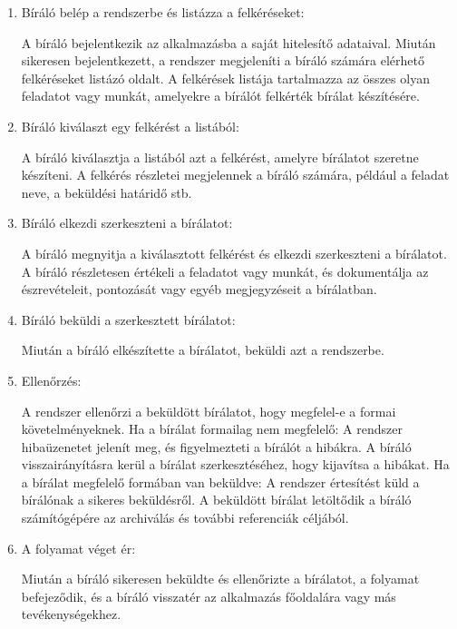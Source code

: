 \begin{enumerate}

\item Bíráló belép a rendszerbe és listázza a felkéréseket:

A bíráló bejelentkezik az alkalmazásba a saját hitelesítő adataival.
Miután sikeresen bejelentkezett, a rendszer megjeleníti a bíráló számára elérhető felkéréseket listázó oldalt.
A felkérések listája tartalmazza az összes olyan feladatot vagy munkát, amelyekre a bírálót felkérték bírálat készítésére.

\item Bíráló kiválaszt egy felkérést a listából:

A bíráló kiválasztja a listából azt a felkérést, amelyre bírálatot szeretne készíteni.
A felkérés részletei megjelennek a bíráló számára, például a feladat neve, a beküldési határidő stb.

\item Bíráló elkezdi szerkeszteni a bírálatot:

A bíráló megnyitja a kiválasztott felkérést és elkezdi szerkeszteni a bírálatot.
A bíráló részletesen értékeli a feladatot vagy munkát, és dokumentálja az észrevételeit, pontozását vagy egyéb megjegyzéseit a bírálatban.

\item Bíráló beküldi a szerkesztett bírálatot:

Miután a bíráló elkészítette a bírálatot, beküldi azt a rendszerbe.

\item Ellenőrzés:

A rendszer ellenőrzi a beküldött bírálatot, hogy megfelel-e a formai követelményeknek.
Ha a bírálat formailag nem megfelelő:
A rendszer hibaüzenetet jelenít meg, és figyelmezteti a bírálót a hibákra.
A bíráló visszairányításra kerül a bírálat szerkesztéséhez, hogy kijavítsa a hibákat.
Ha a bírálat megfelelő formában van beküldve:
A rendszer értesítést küld a bírálónak a sikeres beküldésről.
A beküldött bírálat letöltődik a bíráló számítógépére az archiválás és további referenciák céljából.

\item A folyamat véget ér:

Miután a bíráló sikeresen beküldte és ellenőrizte a bírálatot, a folyamat befejeződik, és a bíráló visszatér az alkalmazás főoldalára vagy más tevékenységekhez.

\end{enumerate}

